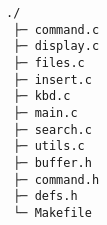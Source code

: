 \documentclass[varwidth,crop]{standalone}
\begin{document}
\begin{verbatim}
./
 ├─ command.c
 ├─ display.c
 ├─ files.c
 ├─ insert.c
 ├─ kbd.c
 ├─ main.c
 ├─ search.c
 ├─ utils.c
 ├─ buffer.h
 ├─ command.h
 ├─ defs.h
 └─ Makefile
\end{verbatim}
\end{document}

